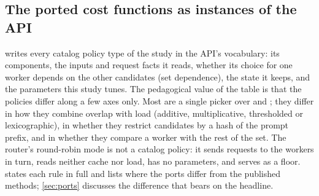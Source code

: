 \subsection{The ported cost functions as instances of the API}
\label{sec:baseline-policies}

 writes every catalog policy type of the study in the API's vocabulary: its
components, the inputs and request facts it reads, whether its choice for one worker depends on the
other candidates (set dependence), the state it keeps, and the parameters this study tunes. The
pedagogical value of the table is that the policies differ along a few axes only. Most are a single
picker over  and ; they differ in how they combine overlap with load
(additive, multiplicative, thresholded or lexicographic), in whether they restrict candidates by a
hash of the prompt prefix, and in whether they compare a worker with the rest of the set. The
router's round-robin mode is not a catalog policy: it sends requests to the workers in turn, reads
neither cache nor load, has no parameters, and serves as a floor.
 states each rule in full and lists where the ports differ from the published
methods; \cref{sec:ports} discusses the difference that bears on the headline.

